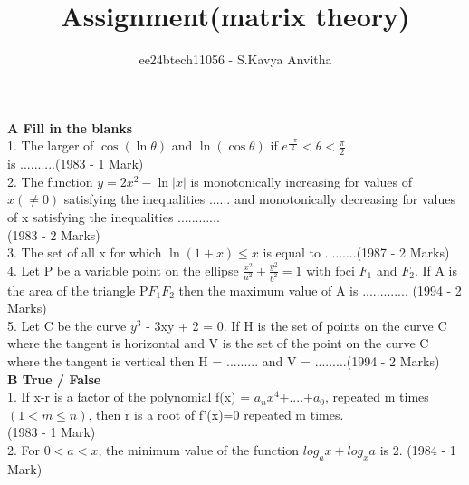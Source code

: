 \documentclass[journal,12pt,twocolumn]{IEEEtran}
\theoremstyle{remark}
\begin{document}

\vspace{3cm}

\title{Assignment(matrix theory)}
\author{ee24btech11056 - S.Kavya Anvitha}
\maketitle
\textbf{A Fill in the blanks}\\[6pt]
1.  The larger of $\cos (\ln \theta)$ and  $\ln (\cos \theta)$ if $e^{\frac{-\pi}{2}}< \theta< \frac{\pi}{2}$\\[2pt] 
\indent is ..........\hspace{4.3cm}(1983 - 1 Mark)\\[3pt]
 2.  The function $y=2x^{2}-\ln |x|$ is monotonically \indent increasing for values of $x(\neq0)$ satisfying the \indent inequalities ...... and monotonically decreasing for \indent values of x satisfying the inequalities ............\\[2pt]\indent\hspace{5.5cm}(1983 - 2 Marks)\\[3pt]
3.  The set of all x for which $\ln (1+x) \leq x$ is equal \indent to .........\hspace{4cm}(1987 - 2 Marks)\\[3pt]
4.  Let P be a variable point on the ellipse $\frac{x^2}{a^2}+\frac{y^2}{b^2} = 1$ \indent with foci $F_1$ and $F_2$. If A is the area of the \indent triangle P$F_1$$F_2$ then the maximum value of A is \hspace{5cm}\indent............. \hspace{3.6cm}(1994 - 2 Marks)\\[3pt]
5.  Let C be the curve $y^3$ - 3xy + 2 = 0. If H is the \indent set of points on the curve C where the tangent \indent is horizontal and V is the set of the point on the \indent curve C where the tangent is vertical then H = \indent ......... and V = .........\hspace{1.7cm}(1994 - 2 Marks)\\[6pt]
\indent\hspace{0.3cm}\textbf{B True / False}\\[6pt]
1. If x-r is a factor of the polynomial f(x) = \indent $a_n$$x^4$+....+$a_0$, repeated m times $(1< m\leq n)$, then \indent r is a root of f'(x)=0 repeated m times.\\[2pt]
\indent \hspace{5.5cm}(1983 - 1 Mark)\\[3pt]
2.  For $0 < a < x$, the minimum value of the function \indent $log_a x + log_x a$ is 2. \hspace{2.3cm}(1984 - 1 Mark)\\[6pt]
\end{document}
